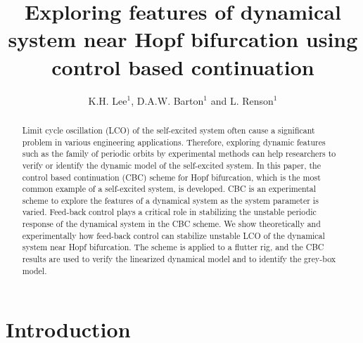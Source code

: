 \documentclass[openacc]{rsproca_new}%
\begin{document}



\title{Exploring features of dynamical system near Hopf bifurcation using control based continuation}

\author{%
K.H. Lee$^{1}$, D.A.W. Barton$^{1}$ and L. Renson$^{1}$}

\address{$^{1}$Department of Engineering Mathematics, University of Bristol\\}

\subject{mechanical engineering, differential equations}



\begin{abstract}
 Limit cycle oscillation (LCO) of the self-excited system often cause a significant problem in various engineering applications. Therefore, exploring dynamic features such as the family of periodic orbits by experimental methods can help researchers to verify or identify the dynamic model of the self-excited system. In this paper, the control based continuation (CBC) scheme for Hopf bifurcation, which is the most common example of a self-excited system, is developed. CBC is an experimental scheme to explore the features of a dynamical system as the system parameter is varied. Feed-back control plays a critical role in stabilizing the unstable periodic response of the dynamical system in the CBC scheme. We show theoretically and experimentally how feed-back control can stabilize unstable LCO of the dynamical system near Hopf bifurcation. The scheme is applied to a flutter rig, and the CBC results are used to verify the linearized dynamical model and to identify the grey-box model.
\end{abstract}

\maketitle

\section{Introduction}\label{int}
\end{document}
